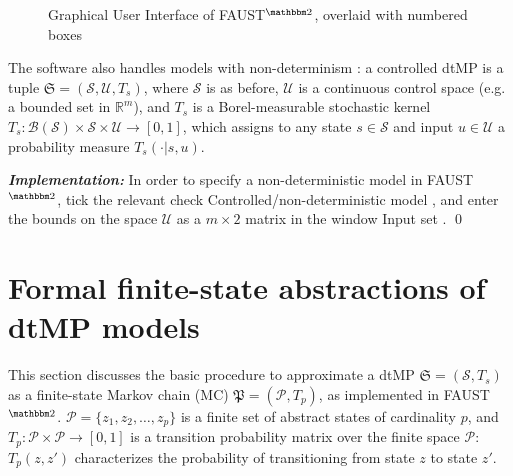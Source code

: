 \documentclass{llncs}
\newcommand*\circled[1]{\tikz[baseline=(char.base)]{\node[shape=circle,draw,inner sep=0.5pt] (char) {#1};}}
\newcommand{\software}{\textsf{FAUST}$^{\mathbbm 2}$\xspace}
\newcommand{\boxname}[1]{\textsf{#1}}
\begin{document}
\begin{figure}
\begin{center}
 \caption{Graphical User Interface of \software, overlaid with numbered boxes}
\label{fig:GUI_Numbered}
\end{center}
\end{figure}
\vspace{-0.2in}

The software also handles models with non-determinism \cite{tmka2013}:
a controlled dtMP is a tuple $\mathfrak S = (\mathcal S,\mathcal U,T_s)$, 
where $\mathcal S$ is as before,
$\mathcal U$ is a continuous control space (e.g. a bounded set in $\mathbb R^m$), 
and $T_s$ is a Borel-measurable stochastic kernel
$T_s:\mathcal B(\mathcal S)\times \mathcal S\times \mathcal U\rightarrow[0,1]$,
which assigns to any state $s\in\mathcal S$ and input $u\in\mathcal U$
a probability measure $T_s(\cdot|s,u)$. 

\textit{\textbf{Implementation: }}
In order to specify a non-deterministic model in \software, 
tick the relevant check \boxname{Controlled/non-deterministic model} \circled{3},  
and enter the bounds on the space $\mathcal U$ as a $m\times 2$ matrix in the window \boxname{Input set} \circled{8}.
\qed

\section{Formal finite-state abstractions of dtMP models}
\label{ABS}

This section discusses the basic procedure to approximate a dtMP $\mathfrak S = (\mathcal S, T_s)$ as a finite-state Markov chain (MC) $\mathfrak P = (\mathcal P, T_p)$, as implemented in \software.  
$\mathcal P = \{z_1, z_2, \ldots, z_p\}$ is a finite set of abstract states of cardinality $p$,  
and $T_p: \mathcal P \times \mathcal P \rightarrow [0,1]$ is a transition probability matrix
over the finite space $\mathcal P$:
$T_p (z, z')$ characterizes the probability of transitioning from state $z$ to state $z'$.  
\end{document}
